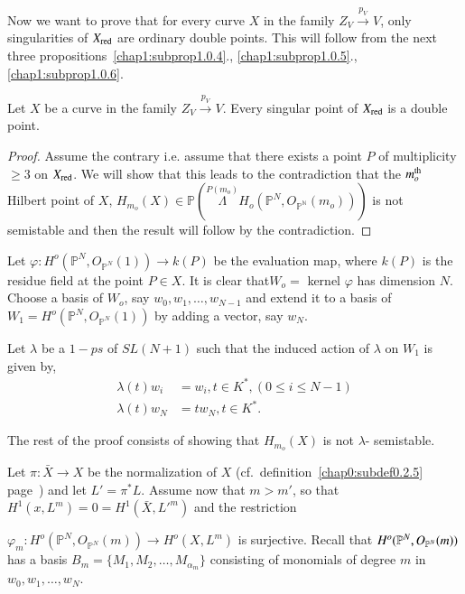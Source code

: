 Now we want to prove that for every curve $X$ in the family $Z_V
\xrightarrow{p_V} V$, only singularities of $X_{\operatorname{red}}$ are ordinary
double points. This will follow from the next three 
propositions~\ref{chap1:subprop1.0.4}., \ref{chap1:subprop1.0.5}.,
\ref{chap1:subprop1.0.6}.  

\begin{subprop}\label{chap1:subprop1.0.4} %
  Let $X$ be a curve in the family $Z_V \xrightarrow {p_V}V$. Every
singular point of $X_{\operatorname{red}}$ is a double point. 
\end{subprop}

\begin{proof} %
Assume the contrary i.e. assume that there exists a point $P$ of
multiplicity $\ge 3$ on $X_{\operatorname{red}}$. We will show that this leads to
the contradiction that the $m_o^{\rm th}$ Hilbert point of $X$,
$H_{m_o}(X) \in \mathbb{P}  (\overset{P(m_o)}{\Lambda} H_o
(\mathbb{P}^N, O_{\mathbb{P^N}} (m_o)))$ is not semistable and then the
result will follow by the contradiction. 
\end{proof}

Let $\varphi : H^o (\mathbb{P}^N, O_{\mathbb{P}^N} (1)) \to k(P) $ be
the evaluation map, where $k(P)$ is the residue field at the point $P
\in X$. It is clear that\pageoriginale $W_o =$ kernel $\varphi$ has
dimension $N$. Choose a basis of $W_o$, say $w_0, w_1, \ldots ,
w_{N-1}$ and extend it to a basis of $W_1 =  H^o (\mathbb{P}^N,
O_{\mathbb{P}^N}(1))$ by adding a vector, say $w_N$. 

Let $\lambda$ be a $1-ps$ of $SL(N+1)$ such that the induced action of 
$\lambda$ on $W_1$ is given by, 
\begin{align*}
\lambda (t) w_i & = w_i, t \in K^*, (0 \le i \le N-1)\\
\lambda (t) w_N & = tw_N, t \in K^*.
\end{align*}

\noindent
The rest of the proof consists of showing that $H_{m_o}(X)$ is not
$\lambda$- semista\-ble. 

Let $\pi : \bar{X} \to X$ be the normalization of $X$ (cf.\ 
definition~\ref{chap0:subdef0.2.5} page~\pageref{chap0:subdef0.2.5}) 
and let $L' = \pi^* L$. Assume now that $m > m'$, 
so that $H^1 (x, L^m) = 0 = H^1 (\bar{X}, L'^{m})$ and the restriction 

$\varphi_m : H^o (\mathbb{P}^N, O_{\mathbb{P}^N}(m)) \to H^o (X, L^m)$
is surjective. Recall that $H^o (\mathbb{P}^N,\break O_{\mathbb{P}^N}(m))$
has a basis $B_m =  \{ M_1, M_2, \ldots, M_{\alpha_m}\}$ consisting of
monomials of degree $m$ in $w_0, w_1, \ldots , w_N$. 

